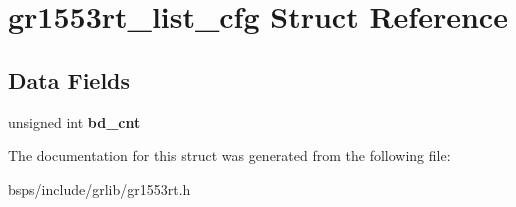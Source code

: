 \hypertarget{structgr1553rt__list__cfg}{}\section{gr1553rt\+\_\+list\+\_\+cfg Struct Reference}
\label{structgr1553rt__list__cfg}
\subsection*{Data Fields}
\begin{DoxyCompactItemize}
\item 
\mbox{\label{structgr1553rt__list__cfg_af30a27db9f0b38c90f73d1a41a6c7bbe}} 
unsigned int {\bfseries bd\+\_\+cnt}
\end{DoxyCompactItemize}


The documentation for this struct was generated from the following file\+:\begin{DoxyCompactItemize}
\item 
bsps/include/grlib/gr1553rt.\+h\end{DoxyCompactItemize}
